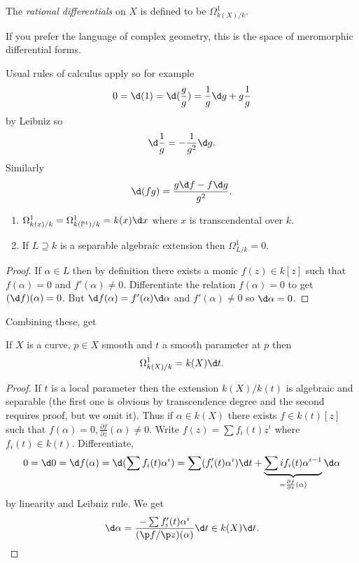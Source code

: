 \documentclass[a4paper]{article}
\renewcommand*{\P}{\mathbb{P}}
\begin{document}
\begin{definition}
  The \emph{rational differentials} on \(X\) is defined to be \(\Omega^1_{k(X)/k}\).
\end{definition}
If you prefer the language of complex geometry, this is the space of meromorphic differential forms.

Usual rules of calculus apply so for example
\[
  0 = \d (1) = \d (\frac{g}{g}) = \frac{1}{g} \d g + g \frac{1}{g}
\]
by Leibniz so
\[
  \d \frac{1}{g} = -\frac{1}{g^2} \d g.
\]
Similarly
\[
  \d(fg) = \frac{g \d f - f \d g}{g^2}.
\]

\begin{corollary}\leavevmode
  \begin{enumerate}
  \item \(\Omega^1_{k(x)/k} = \Omega^1_{k(\P^1)/k} = k(x) \d x\) where \(x\) is transcendental over \(k\).
  \item If \(L \supseteq k\) is a separable algebraic extension then \(\Omega^1_{L/k} = 0\).
  \end{enumerate}
\end{corollary}

\begin{proof}
  If \(\alpha \in L\) then by definition there exists a monic \(f(z) \in k[z]\) such that \(f(\alpha) = 0\) and \(f'(\alpha) \neq 0\). Differentiate the relation \(f(\alpha) = 0\) to get \((\d f)(\alpha) = 0\). But \(\d f(\alpha) = f'(\alpha) \d \alpha\) and \(f'(\alpha) \neq 0\) so \(\d \alpha = 0\).
\end{proof}

Combining these, get

\begin{lemma}
  If \(X\) is a curve, \(p \in X\) smooth and \(t\) a smooth parameter at \(p\) then
  \[
    \Omega^1_{k(X)/k} = k(X) \d t.
  \]
\end{lemma}

\begin{proof}
  If \(t\) is a local parameter then the extension \(k(X)/k(t)\) is algebraic and separable (the first one is obvious by transcendence degree and the second requires proof, but we omit it). Thus if \(\alpha \in k(X)\) there exists \(f \in k(t)[z]\) such that \(f(\alpha) = 0, \frac{\partial f}{\partial z}(\alpha) \neq 0\). Write \(f(z) = \sum f_i(t) z^i\) where \(f_i(t) \in k(t)\). Differentiate,
  \[
    0 = \d 0 = \d f(\alpha) = \d (\sum f_i(t) \alpha^i)
    = \sum (f_i'(t) \alpha^i) \d t + \underbrace{\sum i f_i(t) \alpha^{i - 1}}_{= \frac{\partial f}{\partial z}(\alpha)} \d \alpha
  \]
  by linearity and Leibniz rule. We get
  \[
    \d \alpha = \frac{- \sum f_i'(t) \alpha^i}{(\p f/\p z)(\alpha)} \d t \in k(X) \d t.
  \]
\end{proof}
\end{document}
